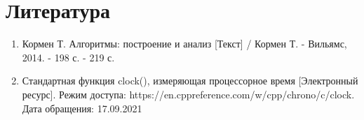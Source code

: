 \documentclass{report}
\begin{document}
\chapter*{Литература}
\begin{enumerate}
	\item Кормен Т. Алгоритмы: построение и анализ [Текст] / Кормен Т. - Вильямс, 2014. - 198 с. - 219 с.
	\item Стандартная функция clock(), измеряющая процессорное время [Электронный ресурс]. Режим доступа: https://en.cppreference.com/w/cpp/chrono/c/clock. Дата обращения: 17.09.2021
\end{enumerate}
\end{document}
